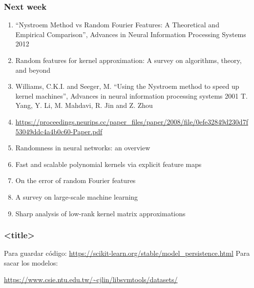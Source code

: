 \begin{frame}
    \frametitle{Next week}

    \begin{enumerate}
        \item “Nystroem Method vs Random Fourier Features: A Theoretical and Empirical Comparison”, Advances in Neural Information Processing Systems 2012
        \item Random features for kernel approximation: A survey on algorithms, theory, and beyond
        \item Williams, C.K.I. and Seeger, M. “Using the Nystroem method to speed up kernel machines”, Advances in neural information processing systems 2001
        T. Yang, Y. Li, M. Mahdavi, R. Jin and Z. Zhou 
        \item \url{https://proceedings.neurips.cc/paper_files/paper/2008/file/0efe32849d230d7f53049ddc4a4b0c60-Paper.pdf}
        \item Randomness in neural networks: an overview
        \item Fast and scalable polynomial kernels via explicit feature maps
        \item On the error of random Fourier features
        \item A survey on large-scale machine learning
        \item Sharp analysis of low-rank kernel matrix approximations
    \end{enumerate}

\end{frame}

\begin{frame}
    \frametitle{<title>}

    Para guardar código: 
    \url{https://scikit-learn.org/stable/model_persistence.html}
    Para sacar los modelos: 

    \url{https://www.csie.ntu.edu.tw/~cjlin/libsvmtools/datasets/}

\end{frame}
